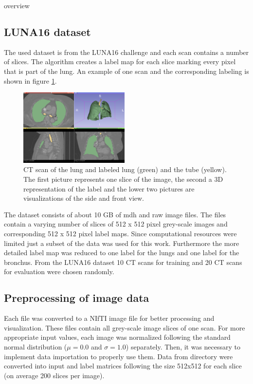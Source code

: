 
overview

\subsection{LUNA16 dataset}

The used dataset is from the LUNA16 challenge and each scan contains a number of slices. The algorithm creates a label map for each slice marking every pixel that is part of the lung. An example of one scan and the corresponding labeling is shown in figure \ref{scan_picture}.

\begin{figure}[h!]
	\includegraphics[width=0.49\textwidth, angle=0]{files/Fulllayoutprediction.png}
	\caption{CT scan of the lung and labeled lung (green) and the tube (yellow). The first picture represents one slice of the image, the second a 3D representation of the label and the lower two pictures are visualizations of the side and front view.}
	\label{scan_picture}
\end{figure}

The dataset consists of about 10 GB of mdh and raw image files. The files contain a varying number of slices of 512 x 512 pixel grey-scale images and corresponding 512 x 512 pixel label maps. Since computational resources were limited just a subset of the data was used for this work. Furthermore the more detailed label map was reduced to one label for the lungs and one label for the bronchus.\newline
From the LUNA16 dataset 10 CT scans for training and 20 CT scans for evaluation were chosen randomly.

\subsection{Preprocessing of image data}
Each file was converted to a NIfTI image file for better processing and visualization. These files contain all grey-scale image slices of one scan. For more appropriate input values, each image was normalized following the standard normal distribution ($\mu = 0.0$ and $\sigma = 1.0$) separately.\newline
Then, it was necessary to implement data importation to properly use them. Data from directory were converted into input and label matrices following the size 512x512 for each slice (on average 200 slices per image).

